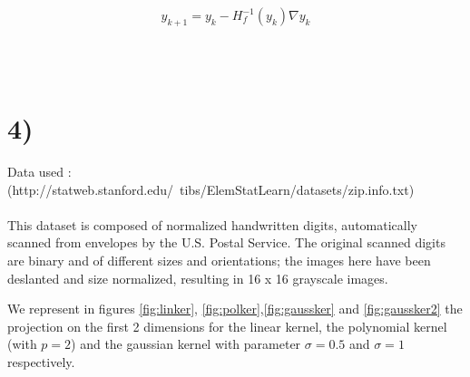 $$y_{k+1}=y_{k}-H_{f}^{-1}(y_{k})\nabla y_{k}$$

~\\
~\\
\section*{4)} Data used : (http://statweb.stanford.edu/~tibs/ElemStatLearn/datasets/zip.info.txt)
~\\
~\\
This dataset is composed of normalized handwritten digits, automatically scanned from envelopes by the U.S. Postal Service. The original
scanned digits are binary and of different sizes and orientations; the
images  here have been deslanted and size normalized, resulting
in 16 x 16 grayscale images.

We represent in figures \ref{fig:linker}, \ref{fig:polker},\ref{fig:gaussker} and \ref{fig:gaussker2} the projection on the first 2 dimensions for the linear kernel, the polynomial kernel (with $p=2$) and the gaussian kernel with parameter $\sigma = 0.5$ and $\sigma = 1$ respectively.
